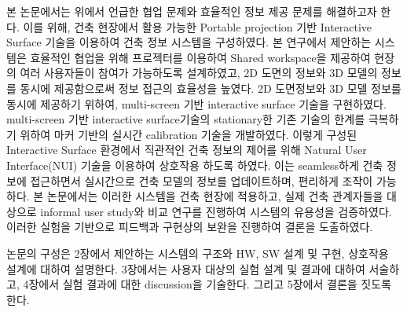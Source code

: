 

본 논문에서는 위에서 언급한 협업 문제와 효율적인 정보 제공 문제를 해결하고자 한다. 이를 위해, 건축 현장에서 활용 가능한 Portable projection 기반 Interactive Surface 기술을 이용하여 건축 정보 시스템을 구성하였다. 본 연구에서 제안하는 시스템은 효율적인 협업을 위해 프로젝터를 이용하여 Shared workspace을 제공하여 현장의 여러 사용자들이 참여가 가능하도록 설계하였고, 2D 도면의 정보와 3D 모델의 정보를 동시에 제공함으로써 정보 접근의 효율성을 높였다. 2D 도면정보와 3D 모델 정보를 동시에 제공하기 위하여, multi-screen 기반 interactive surface 기술\cite{coram_astrotouch:_2013,weiss_benddesk:_2010,wimmer_curve:_2010,benko_miragetable:_2012}을 구현하였다. multi-screen 기반 interactive surface기술의 stationary한 기존 기술의 한계를 극복하기 위하여 마커 기반의 실시간 calibration 기술을 개발하였다. 이렇게 구성된 Interactive Surface 환경에서 직관적인 건축 정보의 제어를 위해 Natural User Interface(NUI) 기술을 이용하여 상호작용 하도록 하였다. 이는 seamless하게 건축 정보에 접근하면서 실시간으로 건축 모델의 정보를 업데이트하며, 편리하게 조작이 가능하다. 
본 논문에서는 이러한 시스템을 건축 현장에 적용하고, 실제 건축 관계자들을 대상으로  informal user study와 비교 연구를 진행하여 시스템의 유용성을 검증하였다. 이러한 실험을 기반으로 피드백과 구현상의 보완을 진행하여 결론을 도출하였다.

논문의 구성은 2장에서 제안하는 시스템의 구조와 HW, SW 설계 및 구현, 상호작용 설계에 대하여 설명한다. 3장에서는 사용자 대상의 실험 설계 및 결과에 대하여 서술하고, 4장에서 실험 결과에 대한 discussion을 기술한다. 그리고 5장에서 결론을 짓도록 한다.



